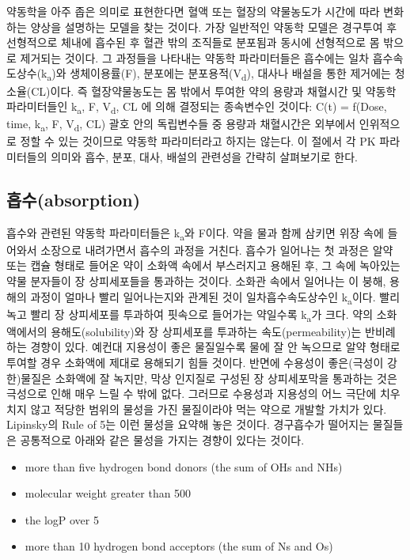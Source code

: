 \documentclass[
  11pt,
  krantz2, a4paper, twoside]{krantz}
\providecommand{\tightlist}{%
  \setlength{\itemsep}{0pt}\setlength{\parskip}{0pt}}
\theoremstyle{definition}
\theoremstyle{definition}
\theoremstyle{definition}
\theoremstyle{definition}
\theoremstyle{remark}
\begin{document}
약동학을 아주 좁은 의미로 표현한다면 혈액 또는 혈장의 약물농도가 시간에
따라 변화하는 양상을 설명하는 모델을 찾는 것이다. 가장 일반적인 약동학
모델은 경구투여 후 선형적으로 체내에 흡수된 후 혈관 밖의 조직들로 분포됨과 동시에 선형적으로 몸 밖으로 제거되는 것이다. 그 과정들을 나타내는 약동학
파라미터들은 흡수에는 일차 흡수속도상수(k\textsubscript{a})와 생체이용률(F), 분포에는
분포용적(V\textsubscript{d}), 대사나 배설을 통한 제거에는 청소율(CL)이다. 즉
혈장약물농도는 몸 밖에서 투여한 약의 용량과 채혈시간 및 약동학
파라미터들인 k\textsubscript{a}, F, V\textsubscript{d}, CL 에 의해 결정되는 종속변수인 것이다: C(t) =
f(Dose, time, k\textsubscript{a}, F, V\textsubscript{d}, CL) 괄호 안의 독립변수들 중 용량과 채혈시간은 외부에서 인위적으로 정할
수 있는 것이므로 약동학 파라미터라고 하지는 않는다. 이 절에서 각 PK
파라미터들의 의미와 흡수, 분포, 대사, 배설의 관련성을 간략히 살펴보기로 한다.

\subsection{흡수(absorption)}\label{uxd761uxc218absorption}

흡수와 관련된 약동학 파라미터들은 k\textsubscript{a}와 F이다. 약을 물과 함께 삼키면 위장 속에 들어와서 소장으로 내려가면서 흡수의 과정을 거친다.
흡수가 일어나는 첫 과정은 알약 또는 캡슐 형태로 들어온 약이 소화액 속에서 부스러지고 용해된 후, 그 속에 녹아있는 약물 분자들이 장 상피세포들을 통과하는 것이다.
소화관 속에서 일어나는 이 붕해, 용해의 과정이 얼마나 빨리 일어나는지와 관계된 것이 일차흡수속도상수인 k\textsubscript{a}이다.
빨리 녹고 빨리 장 상피세포를 투과하여 핏속으로 들어가는 약일수록 k\textsubscript{a}가 크다.
약의 소화액에서의 용해도(solubility)와 장 상피세포를 투과하는 속도(permeability)는 반비례하는 경향이 있다.
예컨대 지용성이 좋은 물질일수록 물에 잘 안 녹으므로 알약 형태로 투여할 경우 소화액에 제대로 용해되기 힘들 것이다.
반면에 수용성이 좋은(극성이 강한)물질은 소화액에 잘 녹지만, 막상 인지질로 구성된 장 상피세포막을 통과하는 것은 극성으로 인해 매우 느릴 수 밖에 없다.
그러므로 수용성과 지용성의 어느 극단에 치우치지 않고 적당한 범위의 물성을 가진 물질이라야 먹는 약으로 개발할 가치가 있다.
Lipinsky의 Rule of 5는 이런 물성을 요약해 놓은 것이다.
경구흡수가 떨어지는 물질들은 공통적으로 아래와 같은 물성을 가지는 경향이 있다는 것이다.

\begin{itemize}
\tightlist
\item
  more than five hydrogen bond donors (the sum of OHs and NHs)
\item
  molecular weight greater than 500
\item
  the logP over 5
\item
  more than 10 hydrogen bond acceptors (the sum of Ns and Os)
\end{itemize}
\end{document}
